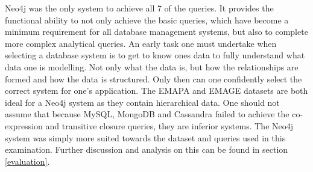 Neo4j was the only system to achieve all 7 of the queries. It provides the functional ability to not only achieve the basic queries, which have become a minimum requirement for all database management systems, but also to complete more complex analytical queries. An early task one must undertake when selecting a database system is to get to know ones data to fully understand what data one is modelling. Not only what the data is, but how the relationships are formed and how the data is structured. Only then can one confidently select the correct system for one's application. The EMAPA and EMAGE datasets are both ideal for a Neo4j system as they contain hierarchical data. One should not assume that because MySQL, MongoDB and Cassandra failed to achieve the co-expression and transitive closure queries, they are inferior systems. The Neo4j system was simply more suited towards the dataset and queries used in this examination. Further discussion and analysis on this can be found in section \ref{evaluation}.